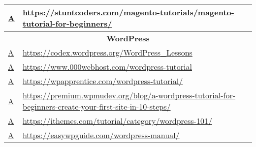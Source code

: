 \begin{table}[]
{\begin{tabular}{|l|p{20cm}|}
  \href{https://web.archive.org/web/20181113030453/https://stuntcoders.com/magento-tutorials/magento-tutorial-for-beginners/}{A}                                    & \href{https://stuntcoders.com/magento-tutorials/magento-tutorial-for-beginners/}{https://stuntcoders.com/magento-tutorials/magento-tutorial-for-beginners/} \\ \hline
\multicolumn{2}{|c|}{\textbf{WordPress}}  \\ \hline
  \href{https://web.archive.org/web/20190213173303/https://codex.wordpress.org/WordPress_Lessons}{A}                                                           & \href{https://codex.wordpress.org/WordPress_Lessons}{https://codex.wordpress.org/WordPress\_Lessons}                                                   \\ \hline
  \href{https://web.archive.org/web/20190213173339/https://www.000webhost.com/wordpress-tutorial}{A}                                                           & \href{https://www.000webhost.com/wordpress-tutorial}{https://www.000webhost.com/wordpress-tutorial}                                                   \\ \hline
  \href{https://web.archive.org/web/20190213173500/https://wpapprentice.com/wordpress-tutorial/}{A}                                                            & \href{https://wpapprentice.com/wordpress-tutorial/}{https://wpapprentice.com/wordpress-tutorial/}                                                   \\ \hline
  \href{https://web.archive.org/web/20190213173528/https://premium.wpmudev.org/blog/a-wordpress-tutorial-for-beginners-create-your-first-site-in-10-steps/}{A} & \href{https://premium.wpmudev.org/blog/a-wordpress-tutorial-for-beginners-create-your-first-site-in-10-steps/}{https://premium.wpmudev.org/blog/a-wordpress-tutorial-for-beginners-create-your-first-site-in-10-steps/}                                                   \\ \hline
  \href{https://web.archive.org/web/20190213173600/https://ithemes.com/tutorial/category/wordpress-101/}{A}                                                    & \href{https://ithemes.com/tutorial/category/wordpress-101/}{https://ithemes.com/tutorial/category/wordpress-101/}                                                   \\ \hline
  \href{https://web.archive.org/web/20190213173628/https://easywpguide.com/wordpress-manual/}{A}                                                               & \href{https://easywpguide.com/wordpress-manual/}{https://easywpguide.com/wordpress-manual/}                                                   \\ \hline

\end{tabular}}
\end{table}
